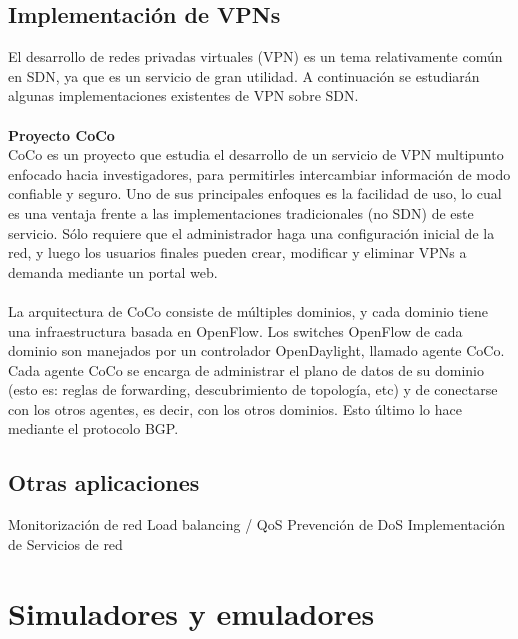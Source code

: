 \subsection{Implementación de VPNs}
El desarrollo de redes privadas virtuales (VPN) es un tema relativamente común en SDN, ya que es un servicio de gran utilidad. A continuación se estudiarán algunas implementaciones existentes de VPN sobre SDN. \\ \\
\textbf{Proyecto CoCo} \\
CoCo \cite{coco-paper} es un proyecto que estudia el desarrollo de un servicio de VPN multipunto enfocado hacia investigadores, para permitirles intercambiar información de modo confiable y seguro. Uno de sus principales enfoques es la facilidad de uso, lo cual es una ventaja frente a las implementaciones tradicionales (no SDN) de este servicio. Sólo requiere que el administrador haga una configuración inicial de la red, y luego los usuarios finales pueden crear, modificar y  eliminar VPNs a demanda mediante un portal web. \\ \\
La arquitectura de CoCo consiste de múltiples dominios, y cada dominio tiene una infraestructura basada en OpenFlow. Los switches OpenFlow de cada dominio son manejados por un controlador OpenDaylight, llamado agente CoCo. Cada agente CoCo se encarga de administrar el plano de datos de su dominio (esto es: reglas de forwarding, descubrimiento de topología, etc) y de conectarse con los otros agentes, es decir, con los otros dominios. Esto último lo hace mediante el protocolo BGP.

\subsection{Otras aplicaciones}
Monitorización de red
Load balancing / QoS
Prevención de DoS
Implementación de Servicios de red

\section{Simuladores y emuladores}
